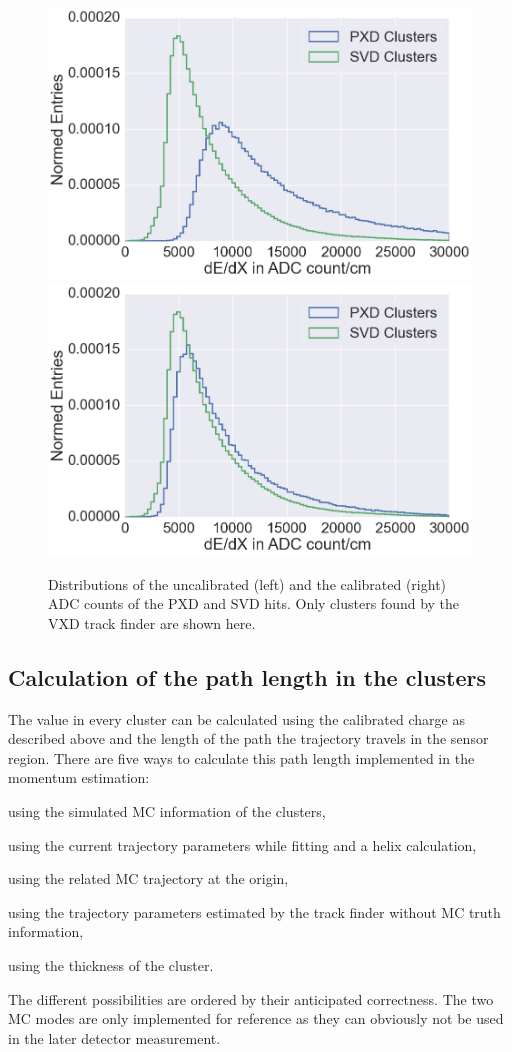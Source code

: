 \begin{figure}
  \centering
 \includegraphics[width=0.48\linewidth]{figures/vxd/dEdXUncalibrated.png}
 \includegraphics[width=0.48\linewidth]{figures/vxd/dEdXCalibrated.png}
 \caption{Distributions of the uncalibrated (left) and the calibrated (right) ADC counts of the PXD and SVD hits. Only clusters found by the VXD track finder are shown here.}
 \label{fig-adc-count}
\end{figure}

\subsection{Calculation of the path length in the clusters}
The \dedx value in every cluster can be calculated using the calibrated charge as described above and the length of the path the trajectory travels in the sensor region. There are five ways to calculate this path length implemented in the momentum estimation:
\begin{zlist}
 \item using the simulated MC information of the clusters,
 \item using the current trajectory parameters while fitting and a helix calculation,
 \item using the related MC trajectory at the origin,
 \item using the trajectory parameters estimated by the track finder without MC truth information,
 \item using the thickness of the cluster.
\end{zlist}

The different possibilities are ordered by their anticipated correctness. The two MC modes are only implemented for reference as they can obviously not be used in the later detector measurement. 

